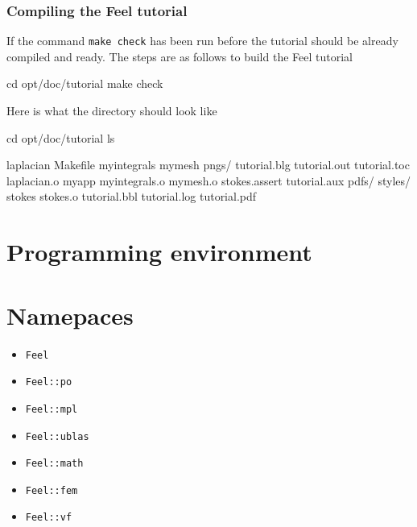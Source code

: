 \documentclass[a4paper]{book}
\begin{document}



\subsubsection{Compiling the Feel tutorial}
\label{sec:comp-feel-tutor}
If the command \lstinline!make check! has been run before the tutorial
should be already compiled and ready. The steps are as follows  to build the Feel tutorial
\begin{unixcom}
  cd opt/doc/tutorial
  make check
\end{unixcom}
Here is what the directory should look like
\begin{unixcom}
  cd opt/doc/tutorial
  ls

  laplacian     Makefile      myintegrals   mymesh       pngs/
  tutorial.blg  tutorial.out  tutorial.toc  laplacian.o  myapp
  myintegrals.o mymesh.o      stokes.assert tutorial.aux pdfs/ styles/
  stokes        stokes.o      tutorial.bbl  tutorial.log tutorial.pdf
\end{unixcom}


\section{Programming environment}

\section{Namepaces}

\begin{itemize}
\item \lstinline!Feel!
\item \lstinline!Feel::po!
\item \lstinline!Feel::mpl!
\item \lstinline!Feel::ublas!
\item \lstinline!Feel::math!
\item \lstinline!Feel::fem!
\item \lstinline!Feel::vf!

\end{itemize}
\end{document}
